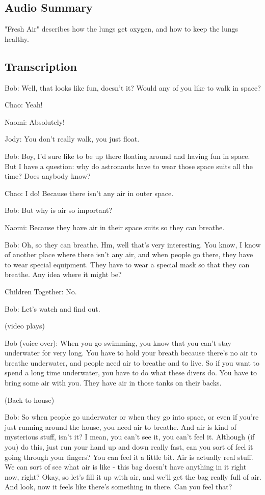 \subsection{Audio Summary}

"Fresh Air" describes how the lungs get oxygen, and how to keep the lungs healthy.

\subsection{Transcription}

Bob: Well, that looks like fun, doesn't it? Would any of you like to walk in space?

Chao: Yeah!

Naomi: Absolutely!

Jody: You don't really walk, you just float.

Bob: Boy, I'd sure like to be up there floating around and having fun in space. But I have a question: why do astronauts have to wear those space suits all the time? Does anybody know?

Chao: I do! Because there isn't any air in outer space.

Bob: But why is air so important?

Naomi: Because they have air in their space suits so they can breathe.

Bob: Oh, so they can breathe. Hm, well that's very interesting. You know, I know of another place where there isn't any air, and when people go there, they have to wear special equipment. They have to wear a special mask so that they can breathe. Any idea where it might be?

Children Together: No.

Bob: Let's watch and find out.

(video plays)

Bob (voice over): When you go swimming, you know that you can't stay underwater for very long. You have to hold your breath because there's no air to breathe underwater, and people need air to breathe and to live. So if you want to spend a long time underwater, you have to do what these divers do. You have to bring some air with you. They have air in those tanks on their backs.

(Back to house)

Bob: So when people go underwater or when they go into space, or even if you're just running around the house, you need air to breathe. And air is kind of mysterious stuff, isn't it? I mean, you can't see it, you can't feel it. Although (if you) do this, just run your hand up and down really fast, can you sort of feel it going through your fingers? You can feel it a little bit. Air is actually real stuff. We can sort of see what air is like - this bag doesn't have anything in it right now, right? Okay, so let's fill it up with air, and we'll get the bag really full of air. And look, now it feels like there's something in there. Can you feel that?

